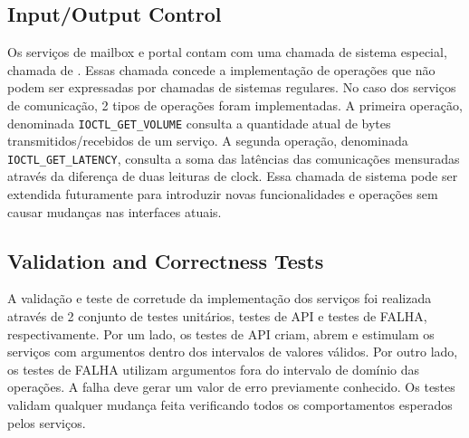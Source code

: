 		\subsection{Input/Output Control}

			Os serviços de mailbox e portal contam com uma chamada de sistema especial, chamada de \ioctl.
			Essas chamada concede a implementação de operações que não podem ser expressadas por chamadas de sistemas regulares.
			No caso dos serviços de comunicação, 2 tipos de operações foram implementadas.
			A primeira operação, denominada \texttt{IOCTL\_GET\_VOLUME} consulta a quantidade atual de bytes transmitidos/recebidos de um serviço.
			A segunda operação, denominada \texttt{IOCTL\_GET\_LATENCY}, consulta a soma das latências das comunicações mensuradas através da diferença de duas leituras de clock.
			Essa chamada de sistema pode ser extendida futuramente para introduzir novas funcionalidades e operações sem causar mudanças nas interfaces atuais.

		\subsection{Validation and Correctness Tests}

			A validação e teste de corretude da implementação dos serviços foi realizada através de 2 conjunto de testes unitários, testes de API e testes de FALHA, respectivamente.
			Por um lado, os testes de API criam, abrem e estimulam os serviços com argumentos dentro dos intervalos de valores válidos.
			Por outro lado, os testes de FALHA utilizam argumentos fora do intervalo de domínio das operações.
			A falha deve gerar um valor de erro previamente conhecido.
			Os testes validam qualquer mudança feita verificando todos os comportamentos esperados pelos serviços.
